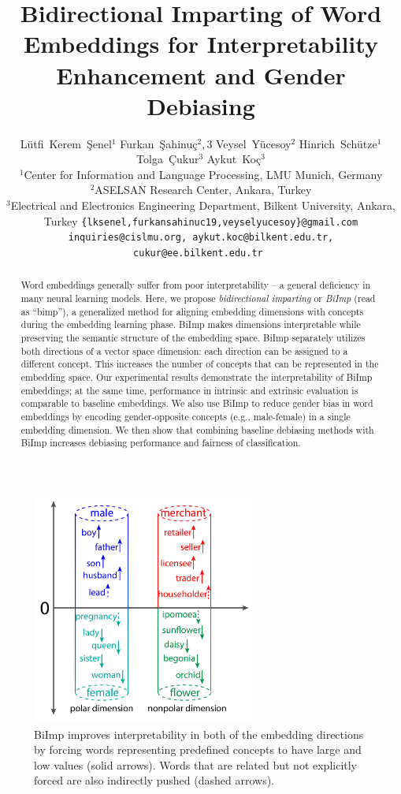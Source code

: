 \documentclass[11pt,a4paper]{article}
\title{Bidirectional Imparting of Word Embeddings for Interpretability Enhancement and Gender Debiasing}
\author{Lütfi~Kerem~Şenel$^1$ \And Furkan~Şahinuç$^2,3$ \And Veysel~Yücesoy$^2$ \And Hinrich~Schütze$^1$ \And Tolga~Çukur$^3$ \And Aykut~Koç$^3$\\
  $^1$Center for Information and Language Processing, LMU Munich, Germany \\
  $^2$ASELSAN Research Center, Ankara, Turkey \\
  $^3$Electrical and Electronics Engineering Department, Bilkent University, Ankara, Turkey
  \texttt{\{lksenel,furkansahinuc19,veyselyucesoy\}@gmail.com}\\
  \texttt{inquiries@cislmu.org, aykut.koc@bilkent.edu.tr, cukur@ee.bilkent.edu.tr } \\}
\date{}
\def\proposedmethod{BiImp}
\begin{document}
\maketitle
\begin{abstract}
  Word embeddings
  generally suffer from poor interpretability -- a general
  deficiency in many neural learning models.
  Here, we propose \emph{bidirectional imparting} or
\emph{\proposedmethod} (read as ``bimp''), a generalized method for aligning embedding
dimensions with concepts during the embedding learning
phase. \proposedmethod{} makes  dimensions interpretable
while preserving the semantic structure of the embedding space.
 \proposedmethod{} separately utilizes both directions of
 a vector space dimension: each direction can be assigned
 to a different concept. This increases the number of
 concepts that can be represented in the embedding space.
 Our experimental results demonstrate the interpretability
of \proposedmethod{} embeddings; at the same time,
performance in intrinsic and extrinsic evaluation is
comparable to baseline embeddings.
We also use \proposedmethod{} 
to reduce gender bias in word embeddings
by encoding gender-opposite concepts (e.g., male-female) in
a single embedding dimension.
We then show that combining 
baseline debiasing methods
with \proposedmethod{} increases debiasing performance and
fairness of classification.
\end{abstract}



\begin{figure}[!h]
    \centering
    \includegraphics[width=7.5cm]{Figures/impart_figure_real.pdf}
    \caption{\proposedmethod{} improves interpretability in both of the embedding directions by forcing words representing predefined concepts to have large and low values (solid arrows). Words that are related but not explicitly forced are also indirectly pushed (dashed arrows).}
    \label{fig:bi_imp}
\end{figure}
\end{document}
